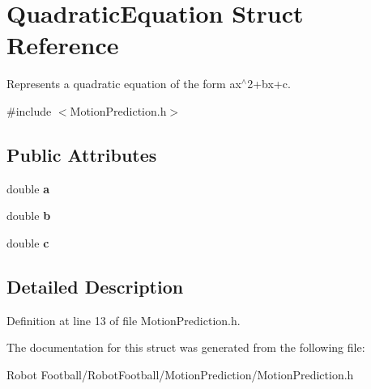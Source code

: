 \hypertarget{struct_quadratic_equation}{\section{Quadratic\-Equation Struct Reference}
\label{struct_quadratic_equation}
}


Represents a quadratic equation of the form ax$^\wedge$2+bx+c.  




{\ttfamily \#include $<$Motion\-Prediction.\-h$>$}

\subsection*{Public Attributes}
\begin{DoxyCompactItemize}
\item 
\hypertarget{struct_quadratic_equation_ac75fc269faf1b22dbae9256a67823627}{double {\bfseries a}}\label{struct_quadratic_equation_ac75fc269faf1b22dbae9256a67823627}

\item 
\hypertarget{struct_quadratic_equation_a7c3b8208e2d36d576d17bee5a7ce812f}{double {\bfseries b}}\label{struct_quadratic_equation_a7c3b8208e2d36d576d17bee5a7ce812f}

\item 
\hypertarget{struct_quadratic_equation_a3ea57c6e9d39a8f4ee2b029db6a8e6d8}{double {\bfseries c}}\label{struct_quadratic_equation_a3ea57c6e9d39a8f4ee2b029db6a8e6d8}

\end{DoxyCompactItemize}


\subsection{Detailed Description}


Definition at line 13 of file Motion\-Prediction.\-h.



The documentation for this struct was generated from the following file\-:\begin{DoxyCompactItemize}
\item 
Robot Football/\-Robot\-Football/\-Motion\-Prediction/Motion\-Prediction.\-h\end{DoxyCompactItemize}
